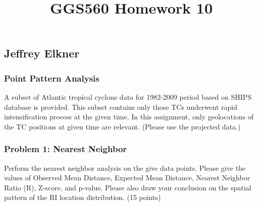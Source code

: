 \documentclass[11pt]{article}
\title{GGS560 Homework 10}
\begin{document}
    
    
    \maketitle
    
    

    

    \hypertarget{jeffrey-elkner}{%
\subsection{Jeffrey Elkner}\label{jeffrey-elkner}}

\hypertarget{point-pattern-analysis}{%
\subsubsection{Point Pattern Analysis}\label{point-pattern-analysis}}

A subset of Atlantic tropical cyclone data for 1982-2009 period based on
SHIPS database is provided. This subset contains only those TCs
underwent rapid intensification process at the given time. In this
assignment, only geolocations of the TC positions at given time are
relevant. (Please use the projected data.)

\hypertarget{problem-1-nearest-neighbor}{%
\subsubsection{Problem 1: Nearest
Neighbor}\label{problem-1-nearest-neighbor}}

Perform the nearest neighbor analysis on the give data points. Please
give the values of Observed Mean Distance, Expected Mean Distance,
Nearest Neighbor Ratio (R), Z-score, and p-value. Please also draw your
conclusion on the spatial pattern of the RI location distribution. (15
points)

\vskip 0.2in
\end{document}
